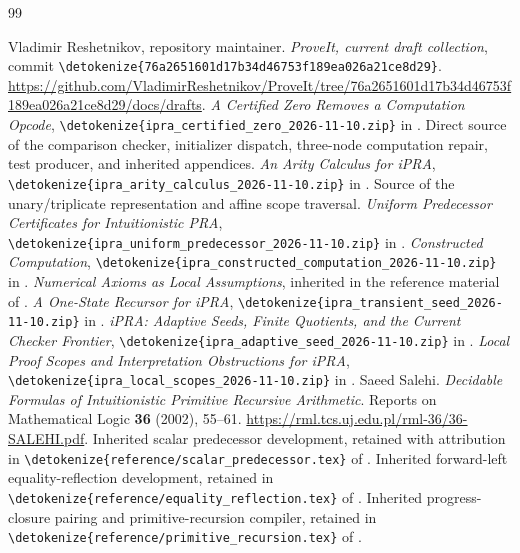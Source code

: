 \documentclass[11pt,letterpaper]{article}
\theoremstyle{definition}\newtheorem{definition}[theorem]{Definition}
\theoremstyle{remark}\newtheorem{remark}[theorem]{Remark}
\newcommand{\file}[1]{\expandafter\nolinkurl\expandafter{\detokenize{#1}}}
\begin{document}





\clearpage
\begin{thebibliography}{99}
\raggedright
{}
Vladimir Reshetnikov, repository maintainer.
\emph{ProveIt, current draft collection}, commit
\file{76a2651601d17b34d46753f189ea026a21ce8d29}.
\url{https://github.com/VladimirReshetnikov/ProveIt/tree/76a2651601d17b34d46753f189ea026a21ce8d29/docs/drafts}.
\emph{A Certified Zero Removes a Computation Opcode},
\file{ipra_certified_zero_2026-11-10.zip} in \cite{corpus}.
Direct source of the comparison checker, initializer dispatch,
three-node computation repair, test producer, and inherited appendices.
\emph{An Arity Calculus for iPRA},
\file{ipra_arity_calculus_2026-11-10.zip} in \cite{corpus}.
Source of the unary/triplicate representation and affine scope traversal.
\emph{Uniform Predecessor Certificates for Intuitionistic PRA},
\file{ipra_uniform_predecessor_2026-11-10.zip} in \cite{corpus}.
\emph{Constructed Computation},
\file{ipra_constructed_computation_2026-11-10.zip} in \cite{corpus}.
\emph{Numerical Axioms as Local Assumptions}, inherited in the reference
material of \cite{arity,constructed}.
\emph{A One-State Recursor for iPRA},
\file{ipra_transient_seed_2026-11-10.zip} in \cite{corpus}.
\emph{iPRA: Adaptive Seeds, Finite Quotients, and the Current Checker Frontier},
\file{ipra_adaptive_seed_2026-11-10.zip} in \cite{corpus}.
\emph{Local Proof Scopes and Interpretation Obstructions for iPRA},
\file{ipra_local_scopes_2026-11-10.zip} in \cite{corpus}.
Saeed Salehi. \emph{Decidable Formulas of Intuitionistic Primitive
Recursive Arithmetic}. Reports on Mathematical Logic \textbf{36}
(2002), 55--61.
\url{https://rml.tcs.uj.edu.pl/rml-36/36-SALEHI.pdf}.
Inherited scalar predecessor development, retained with attribution in
\file{reference/scalar_predecessor.tex} of \cite{certified}.
Inherited forward-left equality-reflection development, retained in
\file{reference/equality_reflection.tex} of \cite{certified}.
Inherited progress-closure pairing and primitive-recursion compiler,
retained in \file{reference/primitive_recursion.tex} of \cite{certified}.
\end{thebibliography}
\end{document}
